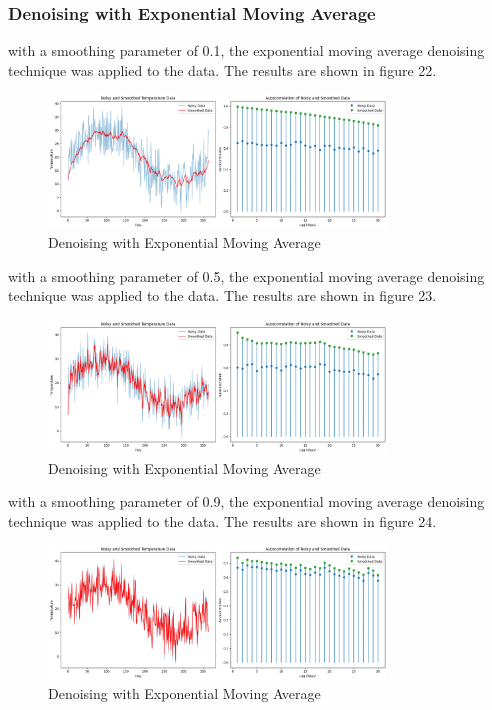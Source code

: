 \documentclass[a4paper,12pt]{article} %
\begin{document}
\subsubsection{ Denoising with Exponential Moving Average}
with a smoothing parameter of 0.1, the exponential moving average denoising technique was applied to the data. The results are shown in figure 22.
\begin{figure}[h]
\centering
\includegraphics[width=0.8\textwidth]{Q2_EMA_0.1.png}
\caption{Denoising with Exponential Moving Average}
\end{figure}
\clearpage
with a smoothing parameter of 0.5, the exponential moving average denoising technique was applied to the data. The results are shown in figure 23.
\begin{figure}[h]
\centering
\includegraphics[width=0.8\textwidth]{Q2_EMA_0.5.png}
\caption{Denoising with Exponential Moving Average}
\end{figure}
\clearpage
with a smoothing parameter of 0.9, the exponential moving average denoising technique was applied to the data. The results are shown in figure 24.
\begin{figure}[h]
\centering
\includegraphics[width=0.8\textwidth]{Q2_EMA_0.9.png}
\caption{Denoising with Exponential Moving Average}
\end{figure}
\clearpage
\end{document}
